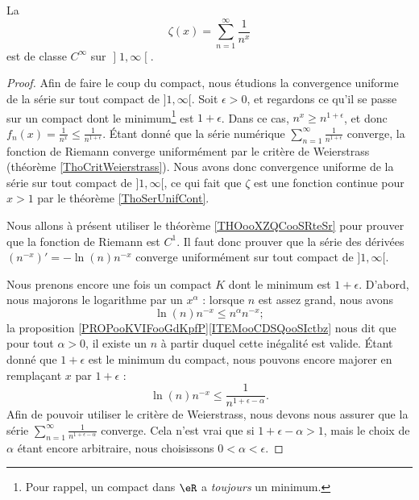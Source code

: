 \begin{lemma}
	La 
	\begin{equation}
		\zeta(x)=\sum_{n=1}^{\infty}\frac{1}{ n^x }
	\end{equation}
	est de classe \( C^{\infty}\) sur \( \mathopen] 1 , \infty \mathclose[\).
\end{lemma}

\begin{proof}
	Afin de faire le coup du compact, nous étudions la convergence uniforme de la série sur tout compact de \( ]1,\infty[\). Soit \( \epsilon>0\), et regardons ce qu'il se passe sur un compact dont le minimum\footnote{Pour rappel, un compact dans \( \eR\) a \emph{toujours} un minimum.} est \( 1+\epsilon\). Dans ce cas, \( n^x\geq n^{1+\epsilon}\), et donc \( f_n(x)=\frac{ 1 }{ n^x }\leq \frac{1}{ n^{1+\epsilon} }\). Étant donné que la série numérique \( \sum_{n=1}^{\infty}\frac{1}{ n^{1+\epsilon} }\) converge, la fonction de Riemann converge uniformément par le critère de Weierstrass (théorème \ref{ThoCritWeierstrass}). Nous avons donc convergence uniforme de la série sur tout compact de \( ]1,\infty[\), ce qui fait que \( \zeta\) est une fonction continue pour \( x>1\) par le théorème \ref{ThoSerUnifCont}.

	Nous allons à présent utiliser le théorème \ref{THOooXZQCooSRteSr} pour prouver que la fonction de Riemann est \( C^1\). Il faut donc prouver que la série des dérivées \( (n^{-x})'=-\ln(n)n^{-x}\) converge uniformément sur tout compact de \( ]1,\infty[\).

	Nous prenons encore une fois un compact \( K\) dont le minimum est \( 1+\epsilon\). D'abord, nous majorons le logarithme par un \( x^{\alpha}\) : lorsque \( n\) est assez grand, nous avons
	\begin{equation}
		\ln(n)n^{-x}\leq n^{\alpha}n^{-x};
	\end{equation}
	la proposition \ref{PROPooKVIFooGdKpfP}\ref{ITEMooCDSQooSIctbz} nous dit que pour tout \( \alpha>0\), il existe un \( n\) à partir duquel cette inégalité est valide. Étant donné que \( 1+\epsilon\) est le minimum du compact, nous pouvons encore majorer en remplaçant \( x\) par \( 1+\epsilon\) :
	\begin{equation}
		\ln(n)n^{-x}\leq \frac{1}{ n^{1+\epsilon-\alpha} }.
	\end{equation}
	Afin de pouvoir utiliser le critère de Weierstrass, nous devons nous assurer que la série \( \sum_{n=1}^{\infty} \frac{ 1 }{ n^{1+\epsilon-\alpha} } \) converge. Cela n'est vrai que si \( 1+\epsilon-\alpha > 1\), mais le choix de \( \alpha\) étant encore arbitraire, nous choisissons \( 0<\alpha<\epsilon\).


\end{proof}
